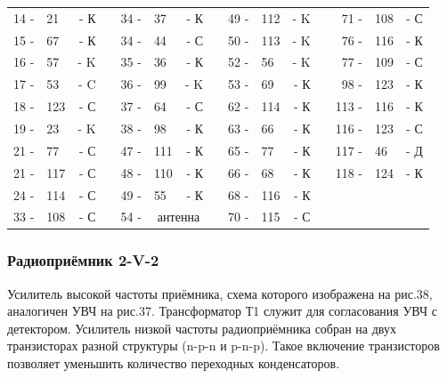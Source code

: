 \documentclass[12pt]{article}
\newcommand{\mc}{\multicolumn}
\begin{document}
\begin{tabular}{r l r p{0.5cm} r l r p{0.5cm} r l r p{0.5cm} r l r}
14 - & 21  & - К &     & 34 - & 37      &   - К    &      &  49 - & 112 & - K &     &  71 - & 108 & - С\\
15 - & 67  & - К &     & 34 - & 44      &   - С    &      &  50 - & 113 & - K &     &  76 - & 116 & - К\\
16 - & 57  & - K &     & 35 - & 36      &   - К    &      &  52 - &  56 & - K &     &  77 - & 109 & - С\\
17 - & 53  & - C &     & 36 - & 99      &   - K    &      &  53 - &  69 & - К &     &  98 - & 123 & - К\\
18 - & 123 & - С &     & 37 - & 64      &   - С    &      &  62 - & 114 & - К &     & 113 - & 116 & - К\\
19 - & 23  & - K &     & 38 - & 98      &   - К    &      &  63 - &  66 & - К &     & 116 - & 123 & - С\\
21 - & 77  & - С &     & 47 - & 111     &   - К    &      &  65 - &  77 & - К &     & 117 - & 46  & - Д\\
21 - & 117 & - С &     & 48 - & 110     &   - К    &      &  66 - &  68 & - К &     & 118 - & 124 & - К\\
24 - & 114 & - С &     & 49 - & 55      &   - К    &      &  68 - & 116 & - К &     &       &     &    \\
33 - & 108 & - С &     & 54 - & \mc{2}{c}{антенна} &      &  70 - & 115 & - С &     &       &     &    \\
\end{tabular}

\hrulefill

\vspace*{1cm}
\subsubsection{Радиоприёмник 2-V-2}

Усилитель высокой частоты приёмника, схема которого изображена на рис.38, аналогичен УВЧ на рис.37. Трансформатор Т1 служит для согласования УВЧ с детектором. Усилитель низкой частоты радиоприёмника собран на двух транзисторах разной структуры (n-p-n и p-n-p). Такое включение транзисторов позволяет уменьшить количество переходных конденсаторов.

\newpage
\end{document}
